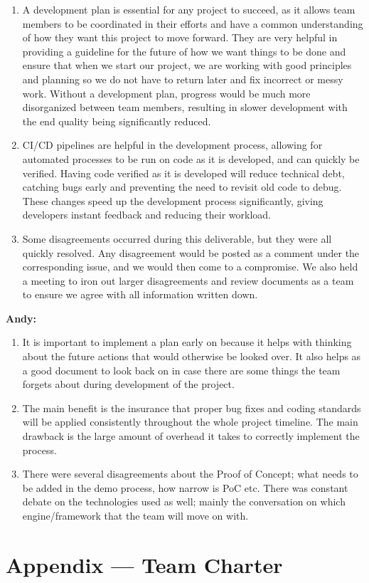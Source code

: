 \documentclass{article}
\begin{document}
\begin{enumerate}
	\item A development plan is essential for any project to succeed, as it allows team members to be coordinated in their efforts
	and have a common understanding of how they want this project to move forward. They are very helpful in providing a guideline 
	for the future of how we want things to be done and ensure that when we start our project, we are working with good principles 
	and planning so we do not have to return later and fix incorrect or messy work. Without a development plan, progress would be 
	much more disorganized between team members, resulting in slower development with the end quality being significantly reduced.
	\item CI/CD pipelines are helpful in the development process, allowing for automated processes to be run on code as it is developed, 
	and can quickly be verified. Having code verified as it is developed will reduce technical debt, catching bugs early and preventing 
	the need to revisit old code to debug. These changes speed up the development process significantly, giving developers instant feedback 
	and reducing their workload.
	\item Some disagreements occurred during this deliverable, but they were all quickly resolved. Any disagreement would be 
	posted as a comment under the corresponding issue, and we would then come to a compromise. We also held a meeting to iron
	out larger disagreements and review documents as a team to ensure we agree with all information written down.
\end{enumerate}

\textbf{Andy: }
\begin {enumerate}
    \item It is important to implement a plan early on because it helps with thinking about the future actions that would otherwise
    be looked over. It also helps as a good document to look back on in case there are some things the team forgets about during development of the project.

    \item The main benefit is the insurance that proper bug fixes and coding standards will be applied consistently throughout the whole project timeline.
    The main drawback is the large amount of overhead it takes to correctly implement the process. 
    \item There were several disagreements about the Proof of Concept; what needs to be added in the demo process, how narrow is PoC etc. There was constant
    debate on the technologies used as well; mainly the conversation on which engine/framework that the team will move on with.
\end{enumerate}

\newpage{}

\section*{Appendix --- Team Charter}



\newpage{}


% 

\end{document}
